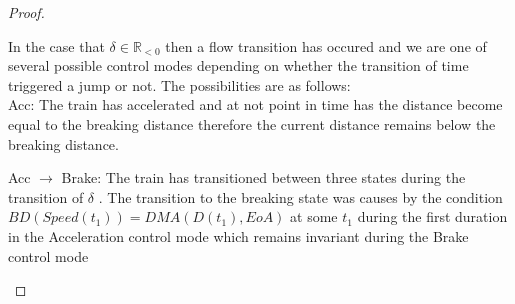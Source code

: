 \begin{mytheorem}
\begin{proof}
\begin{description}
In the case that $\delta \in \mathbb{R}_{< 0}$ then a flow transition has occured and we are one of several
possible control modes depending on whether the transition of time triggered a jump or not.  The possibilities are as follows: \\

Acc: The train has accelerated and at not point in time has the distance become equal to the breaking distance therefore the current distance remains below the breaking distance. 


Acc $\to$ Brake: The train has transitioned between three states during the transition of $\delta$  . The transition to the breaking state was causes by the condition $BD(Speed(t_1)) = DMA(D(t_1), EoA)$ at some $t_1$ during the first duration in the Acceleration control mode which remains invariant during the Brake control mode 

\begin{comment}
Acc $\to$ Brake $\to$ Acc: The train has transitioned between three states during the transition of $\delta$  . The transition to the braking state was caused by the condition $BD(Speed(t_1)) = DMA(D(t_1), EoA)$ being met at some $t_1$ during the first duration in the Acc control mode which remains invariant during the Brake control mode. Then at another time $t_2$ the event MA.TrainID.EoA' occurs meaning a new movement authority has been granted EoA' such that $EoA + tsegsize \leq EoA'$ and the train transitions ot the Accelerating mode once again with the train travelling at $Speed(t_1)$.  At this point the invariant $BD(Speed(t_2)) \leq DMA(D(t_2), EoA')$ holds as we know previously at time $t_1$ that $BD(Speed(t_1)) = DMA(D(t_1), EoA)$ holds and since by the assumption $maxspeed + maxspeed^2 < tsegsize$ it is not possible for the train to travel an entire track segment and therefore $BD(Speed(t_3)) \leq DMA(D(t_3), EoA'')$ holds at all times $t_3$ in the second Acceleration control mode. 
\end{comment}

\begin{comment}
 In the $Accelerating$ mode we have $\dot{Speed} = 1$ with $D(t) \leq BD(EoA, Speed) \leq  EoA$. There are two cases either $D(t) = BD(EoA,Speed)$ or $D(t) < BD(EoA,Speed)$.  In the case that $D(t) = BD(EoA,Speed)$  a jump occurs taking the system into the Braking mode
with $D(t_1) = BD(Speed,t_1) < EoA$. In the case that $D(t_1) < BD(Speed,t_1)$ time will progress and at some point in the future $t_2$ the train will with reach the braking point $D(t_2) = BD(Speed',t_2)$ or $Speed' = Max Speed \wedge (D(t_2) < BD(Speed', t_2)$.   In the case that $D(t_2) = BD(Speed', t_2)$ a jump will occur taking the train into the braking mode with $D(t_2) = BD(Speed',t_2) < EoA$. Otherwise $Speed = MaxSpeed$ and a jump is performed to the $Full Allowed Speed$ mode with $D(t_2) < BD(Speed', t_2) < EoA$.
\end{comment}


\end{description}
\end{proof}
\end{mytheorem}
